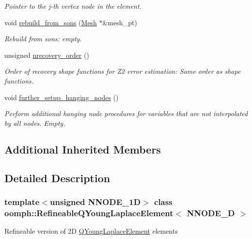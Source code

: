 \begin{DoxyCompactItemize}
\begin{DoxyCompactList}\small\item\em Pointer to the j-\/th vertex node in the element. \end{DoxyCompactList}\item 
void \hyperlink{classoomph_1_1RefineableQYoungLaplaceElement_a2a8efe3d30e165de70aad77536bf55c9}{rebuild\+\_\+from\+\_\+sons} (\hyperlink{classoomph_1_1Mesh}{Mesh} $\ast$\&mesh\+\_\+pt)
\begin{DoxyCompactList}\small\item\em Rebuild from sons\+: empty. \end{DoxyCompactList}\item 
unsigned \hyperlink{classoomph_1_1RefineableQYoungLaplaceElement_a2a24b6a44fc8c95e9648e9cd5a2a9730}{nrecovery\+\_\+order} ()
\begin{DoxyCompactList}\small\item\em Order of recovery shape functions for Z2 error estimation\+: Same order as shape functions. \end{DoxyCompactList}\item 
void \hyperlink{classoomph_1_1RefineableQYoungLaplaceElement_a2bf2a41febf535ba6993e7aafbf769c2}{further\+\_\+setup\+\_\+hanging\+\_\+nodes} ()
\begin{DoxyCompactList}\small\item\em Perform additional hanging node procedures for variables that are not interpolated by all nodes. Empty. \end{DoxyCompactList}\end{DoxyCompactItemize}
\subsection*{Additional Inherited Members}


\subsection{Detailed Description}
\subsubsection*{template$<$unsigned N\+N\+O\+D\+E\+\_\+1D$>$\newline
class oomph\+::\+Refineable\+Q\+Young\+Laplace\+Element$<$ N\+N\+O\+D\+E\+\_\+D $>$}

Refineable version of 2D \hyperlink{classoomph_1_1QYoungLaplaceElement}{Q\+Young\+Laplace\+Element} elements 

